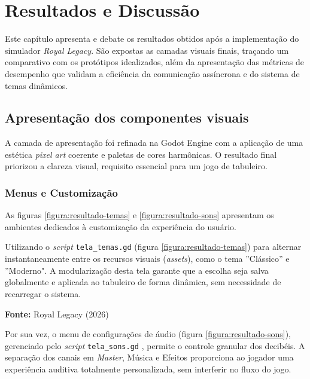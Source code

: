 \chapter{Resultados e Discussão}
\label{capitulo:resultados_discussao}

Este capítulo apresenta e debate os resultados obtidos após a implementação do simulador \textit{Royal Legacy}. São expostas as camadas visuais finais, traçando um comparativo com os protótipos idealizados, além da apresentação das métricas de desempenho que validam a eficiência da comunicação assíncrona e do sistema de temas dinâmicos.

\section{Apresentação dos componentes visuais}
\label{secao:interfaces-finais}

A camada de apresentação foi refinada na Godot Engine com a aplicação de uma estética \textit{pixel art} coerente e paletas de cores harmônicas. O resultado final priorizou a clareza visual, requisito essencial para um jogo de tabuleiro.

\subsection{Menus e Customização}

As figuras \ref{figura:resultado-temas} e \ref{figura:resultado-sons} apresentam os ambientes dedicados à customização da experiência do usuário. 

Utilizando o \textit{script} \texttt{tela\_temas.gd} \cite{RoyalLegacy2026} (figura \ref{figura:resultado-temas}) para alternar instantaneamente entre os recursos visuais (\textit{assets}), como o tema ''Clássico'' e ''Moderno". A modularização desta tela garante que a escolha seja salva globalmente e aplicada ao tabuleiro de forma dinâmica, sem necessidade de recarregar o sistema.

\begin{center}
	\vspace{-0.2cm} %
	\small \textbf{Fonte:} Royal Legacy (2026)
\end{center}

Por sua vez, o menu de configurações de áudio (figura \ref{figura:resultado-sons}), gerenciado pelo \textit{script} \texttt{tela\_sons.gd} \cite{RoyalLegacy2026}, permite o controle granular dos decibéis. A separação dos canais em \textit{Master}, Música e Efeitos proporciona ao jogador uma experiência auditiva totalmente personalizada, sem interferir no fluxo do jogo.

